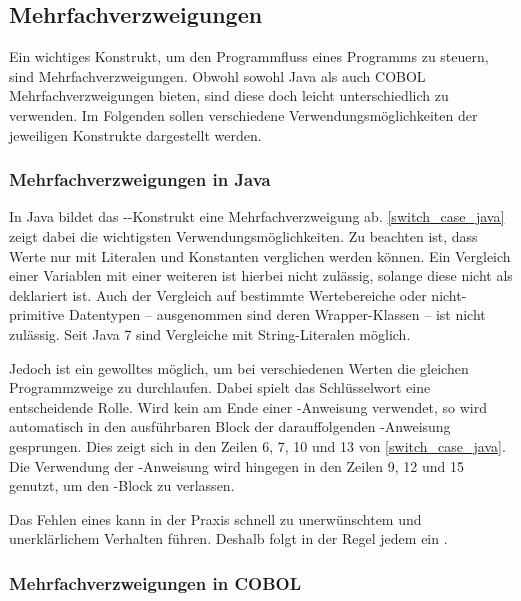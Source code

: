 \subsection{Mehrfachverzweigungen}\label{mehrfachverzweigungen}
Ein wichtiges Konstrukt, um den Programmfluss eines Programms zu steuern, sind Mehrfachverzweigungen. Obwohl sowohl Java als auch COBOL Mehrfachverzweigungen bieten, sind diese doch leicht unterschiedlich zu verwenden. Im Folgenden sollen verschiedene Verwendungsmöglichkeiten der jeweiligen Konstrukte dargestellt werden.

\subsubsection*{Mehrfachverzweigungen in Java}

In Java bildet das --Konstrukt eine Mehrfachverzweigung ab. \autoref{switch_case_java} zeigt dabei die wichtigsten Verwendungsmöglichkeiten. Zu beachten ist, dass Werte nur mit Literalen und Konstanten verglichen werden können. Ein Vergleich einer Variablen mit einer weiteren ist hierbei nicht zulässig, solange diese nicht als  deklariert ist. Auch der Vergleich auf bestimmte Wertebereiche oder nicht-primitive Datentypen -- ausgenommen sind deren Wrapper-Klassen -- ist nicht zulässig. Seit Java 7 sind Vergleiche mit String-Literalen möglich.


Jedoch ist ein gewolltes  möglich, um bei verschiedenen Werten die gleichen Programmzweige zu durchlaufen. Dabei spielt das Schlüsselwort  eine entscheidende Rolle. Wird kein  am Ende einer -Anweisung verwendet, so wird automatisch in den ausführbaren Block der darauffolgenden -Anweisung gesprungen. Dies zeigt sich in den Zeilen 6, 7, 10 und 13 von \autoref{switch_case_java}. Die Verwendung der -Anweisung wird hingegen in den Zeilen 9, 12 und 15 genutzt, um den -Block zu verlassen.
 
Das Fehlen eines  kann in der Praxis schnell zu unerwünschtem und unerklärlichem Verhalten führen. Deshalb folgt in der Regel jedem  ein . 

\subsubsection*{Mehrfachverzweigungen in COBOL}

